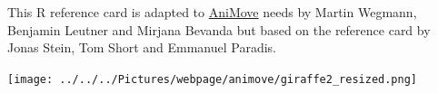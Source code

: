 \documentclass[8pt,landscape]{article}
\begin{document}
\begin{multicols*}{3}
This R reference card is adapted to \href{mailto:contact@animove.org}{AniMove} needs by Martin Wegmann, Benjamin Leutner and Mirjana Bevanda but based on the reference card by Jonas Stein, Tom Short and Emmanuel Paradis.

\bigskip

\bigskip

\begin{center}
 \texttt{[image: ../../../Pictures/webpage/animove/giraffe2\_resized.png]}
\end{center}

  
\end{multicols*}
\end{document}

